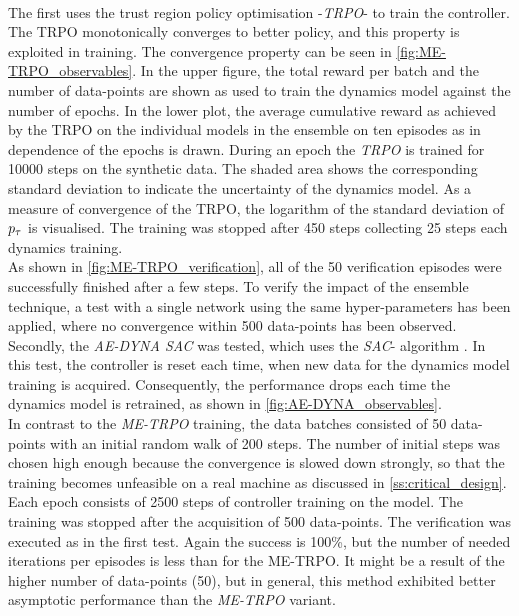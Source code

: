 \documentclass[
reprint,
amsmath,amssymb,amsfonts,clevref,
aps,
prstab,
]{revtex4-2}
\begin{document}
	\\ The first uses the trust region policy optimisation -\emph{TRPO}- \cite{Schulman2015} to train the controller. The TRPO monotonically converges to better policy, and this property is exploited in training. The convergence property can be seen in \cref{fig:ME-TRPO_observables}. In the upper figure, the total reward per batch and the number of data-points are shown as used to train the dynamics model against the number of epochs. In the lower plot, the average cumulative reward as achieved by the TRPO on the individual models in the ensemble on ten episodes as in dependence of the epochs is drawn. During an epoch the \emph{TRPO} is trained for 10000 steps on the synthetic data. The shaded area shows the corresponding standard deviation to indicate the uncertainty of the dynamics model. As a measure of convergence of the TRPO, the logarithm of the standard deviation of $p_\tau$ is visualised. The training was stopped after 450 steps collecting 25 steps each dynamics training.
	\\ As shown in \cref{fig:ME-TRPO_verification}, all of the 50 verification episodes were successfully finished after a few steps. To verify the impact of the ensemble technique, a test with a single network using the same hyper-parameters has been applied, where no convergence within 500 data-points has been observed. \\
	Secondly, the \emph{AE-DYNA SAC} was tested, which uses the \emph{SAC}- algorithm \cite{Haarnoja2018a}. In this test, the controller is reset each time, when new data for the dynamics model training is acquired. Consequently, the performance drops each time the dynamics model is retrained, as shown in \cref{fig:AE-DYNA_observables}.\\
	In contrast to the \emph{ME-TRPO} training, the data batches consisted of 50 data-points with an initial random walk of 200 steps. The number of initial steps was chosen high enough because the convergence is slowed down strongly, so that the training becomes unfeasible on a real machine as discussed in \cref{ss:critical_design}. Each epoch consists of 2500 steps of controller training on the model. The training was stopped after the acquisition of 500 data-points. The verification was executed as in the first test. Again the success is 100\%, but the number of needed iterations per episodes is less than for the ME-TRPO. It might be a result of the higher number of data-points (50), but in general, this method exhibited better asymptotic performance than the \emph{ME-TRPO} variant.
\end{document}
